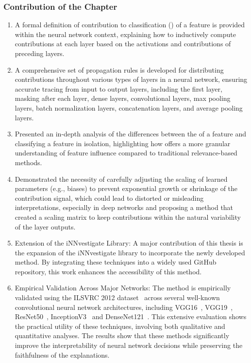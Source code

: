 \subsubsection*{Contribution of the Chapter}

\begin{enumerate} 
\item A formal definition of contribution to classification (\CTC\/) of a feature is provided within the neural network context, explaining how to inductively compute contributions at each layer based on the activations and contributions of preceding layers.
\item A comprehensive set of propagation rules is developed for distributing contributions throughout various types of layers in a neural network, ensuring accurate tracing from input to output layers, including the first layer, masking after each layer, dense layers, convolutional layers, max pooling layers, batch normalization layers, concatenation layers, and average pooling layers.
\item Presented an in-depth analysis of the differences between the \CTC\/ of a feature and classifying a feature in isolation, highlighting how \CTC\/ offers a more granular understanding of feature influence compared to traditional relevance-based methods.
\item Demonstrated the necessity of carefully adjusting the scaling of learned parameters (e.g., biases) to prevent exponential growth or shrinkage of the contribution signal, which could lead to distorted or misleading interpretations, especially in deep networks and proposing a method that created a scaling matrix to keep contributions within the natural variability of the layer outputs.
\item Extension of the iNNvestigate Library: A major contribution of this thesis is the expansion of the iNNvestigate library to incorporate the newly developed \CTC\/ method. By integrating these techniques into a widely used GitHub repository, this work enhances the accessibility of this method.
\item Empirical Validation Across Major Networks: The \CTC\/ method is empirically validated using the ILSVRC 2012 dataset~\cite{ILSVRC15} across several well-known convolutional neural network architectures, including VGG16~\cite{SimonyanZ14a}, VGG19~\cite{SimonyanZ14a}, ResNet50~\cite{he2015deep}, InceptionV3~\cite{szegedy2015rethinking} and DenseNet121~\cite{huang2018densely}. This extensive evaluation shows the practical utility of these techniques, involving both qualitative and quantitative analyses. The results show that these methods significantly improve the interpretability of neural network decisions while preserving the faithfulness of the explanations.
\end{enumerate}

